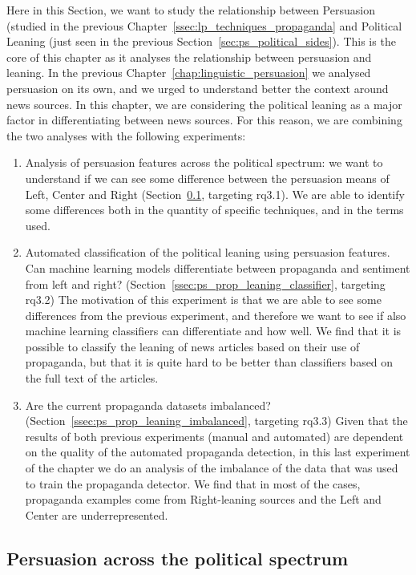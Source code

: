 Here in this Section, we want to study the relationship between Persuasion (studied in the previous Chapter~\ref{ssec:lp_techniques_propaganda} and Political Leaning (just seen in the previous Section~\ref{sec:ps_political_sides}).
This is the core of this chapter as it analyses the relationship between persuasion and leaning. In the previous Chapter~\ref{chap:linguistic_persuasion} we analysed persuasion on its own, and we urged to understand better the context around news sources. In this chapter, we are considering the political leaning as a major factor in differentiating between news sources.
For this reason, we are combining the two analyses with the following experiments:

\begin{enumerate}
    \item Analysis of persuasion features across the political spectrum: we want to understand if we can see some difference between the persuasion means of Left, Center and Right (Section~\ref{ssec:ps_prop_leaning_across}, targeting \acrshort{rq}3.1). We are able to identify some differences both in the quantity of specific techniques, and in the terms used.
    \item Automated classification of the political leaning using persuasion features. Can machine learning models differentiate between propaganda and sentiment from left and right? (Section~\ref{ssec:ps_prop_leaning_classifier}, targeting \acrshort{rq}3.2) The motivation of this experiment is that we are able to see some differences from the previous experiment, and therefore we want to see if also machine learning classifiers can differentiate and how well. We find that it is possible to classify the leaning of news articles based on their use of propaganda, but that it is quite hard to be better than classifiers based on the full text of the articles. 
    \item Are the current propaganda datasets imbalanced? (Section~\ref{ssec:ps_prop_leaning_imbalanced}, targeting \acrshort{rq}3.3) Given that the results of both previous experiments (manual and automated) are dependent on the quality of the automated propaganda detection, in this last experiment of the chapter we do an analysis of the imbalance of the data that was used to train the propaganda detector. We find that in most of the cases, propaganda examples come from Right-leaning sources and the Left and Center are underrepresented.
\end{enumerate}

\subsection{\statusgreen Persuasion across the political spectrum}
\label{ssec:ps_prop_leaning_across}

